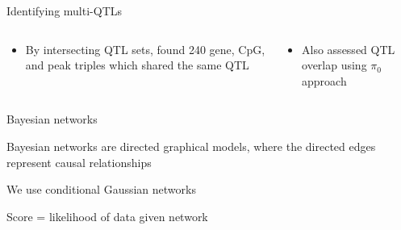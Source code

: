 \documentclass{beamer}
\begin{document}
\begin{frame}{Identifying multi-QTLs}
\begin{columns}
    \begin{column}{0.5\textwidth}
        \begin{itemize}
            \item By intersecting QTL sets, found 240 gene, CpG, and peak
                triples which shared the same QTL 
        \end{itemize}
        
    \end{column}
    \pause
    \begin{column}{0.5\textwidth}
        \begin{itemize}
            \item Also assessed QTL overlap using $\pi_0$ approach 
        \end{itemize}
        \vspace{-0.3cm}
        
        \vspace{-0.5cm}
    \end{column}
\end{columns}
\end{frame}

\tikzexternaldisable
\begin{frame}{Bayesian networks}
    \begin{itemize}
        \item Bayesian networks are directed graphical models, where the
            directed edges represent causal relationships
         {
        \item We use conditional Gaussian networks
        }
         {
        \item Score = likelihood of data given network
        }
    \end{itemize}
    \begin{center}
    \end{center}
\end{frame}
\end{document}
